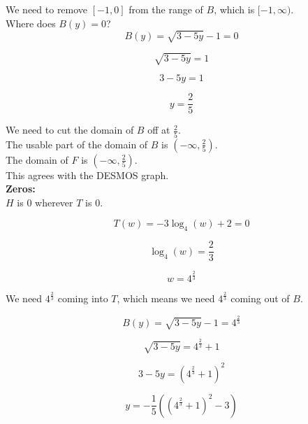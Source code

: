 \documentclass{ximera}
\begin{document}
We need to remove $[-1, 0]$ from the range of $B$, which is $[-1, \infty)$. \\


Where does $B(y) = 0$? \\


\[
B(y) = \sqrt{3 - 5y} - 1 = 0
\]


\[
\sqrt{3 - 5y} = 1
\]


\[
3 - 5y = 1
\]

\[
y = \frac{2}{5}
\]

We need to cut the domain of $B$ off at $\frac{2}{5}$. \\


The usable part of the domain of $B$ is  $\left(-\infty, \frac{2}{5} \right)$. \\


The domain of $F$ is $\left(-\infty, \frac{2}{5} \right)$. \\


This agrees with the DESMOS graph. \\













\textbf{\textcolor{blue!55!black}{Zeros:}} \\



$H$ is $0$ wherever $T$ is $0$.






\[
T(w) = -3 \log_4(w) + 2 = 0
\]


\[
 \log_4(w) = \frac{2}{3}
\]


\[
w = 4^{\tfrac{2}{3}}
\]



We need $4^{\tfrac{2}{3}}$ coming into $T$, which means we need $4^{\tfrac{2}{3}}$ coming out of $B$.





\[
B(y) = \sqrt{3 - 5y} - 1 = 4^{\tfrac{2}{3}}
\]



\[
\sqrt{3 - 5y} = 4^{\tfrac{2}{3}} + 1
\]



\[
3 - 5y = \left( 4^{\tfrac{2}{3}} + 1 \right)^2
\]



\[
y = -\frac{1}{5} \left( \left( 4^{\tfrac{2}{3}} + 1 \right)^2 - 3 \right)
\]
\end{document}
